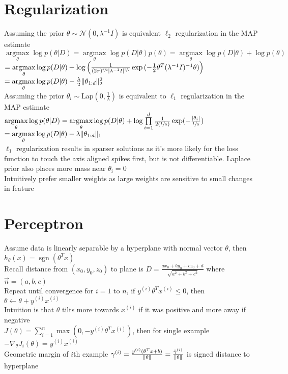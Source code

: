 \documentclass{article}
\newcommand{\N}{\mathcal{N}}
\DeclareMathOperator*{\argmax}{argmax}
\DeclareMathOperator{\sgn}{sgn}
\DeclarePairedDelimiter\abs{\lvert}{\rvert}
\DeclarePairedDelimiter\norm{\lVert}{\rVert}
\begin{document}
\section{Regularization}
Assuming the prior $\theta \sim \N(0, \lambda^{-1}I)$ is equivalent $\ell_2$ regularization in the MAP estimate \\
$\argmax\limits_\theta \log p(\theta | D) = \argmax\limits_\theta \log p(D | \theta) p(\theta) = \argmax\limits_\theta \log p(D| \theta) + \log p(\theta)$ \\
\hspace*{2.717cm} $ = \argmax\limits_\theta \log p(D| \theta) + \log \Big(\frac{1}{(2\pi)^{\sfrac{d}{2}} \abs{\lambda^{-1}I}^{\sfrac{1}{2}}}\exp{(-\frac{1}{2} \theta^T (\lambda^{-1}I)^{-1} \theta)}\Big) $ \\
\hspace*{2.717cm} $ =\argmax\limits_\theta  \log p(D| \theta) - \frac{\lambda}{2}\norm {\theta_{1:d}}_2^2$ \\
Assuming the prior $\theta_i \sim \mbox{Lap}(0, \frac{1}{\lambda})$ is equivalent to $\ell_1$ regularization in the MAP estimate \\
$\argmax\limits_\theta \log p(\theta | D) = \argmax\limits_\theta \log p(D| \theta) + \log \prod\limits_{i=1}^d \frac{1}{2 (\sfrac{1}{\lambda})}\exp (-\frac{\abs{ \theta_i}}{\sfrac{1}{\lambda}})$ \\
\hspace*{2.717cm} $ = \argmax\limits_\theta \log p(D| \theta) -\lambda \norm{\theta_{1:d}}_1$ \\
$\ell_1$ regularization results in sparser solutions as it's more likely for the loss function to touch the axis aligned spikes first, but is not differentiable. Laplace prior also places more mass near $\theta_i = 0$ \\
Intuitively prefer smaller weights as large weights are sensitive to small changes in feature


\newpage
\section{Perceptron}
Assume data is linearly separable by a hyperplane with normal vector $\theta$, then $h_\theta(x) = \sgn(\theta^Tx)$ \\
Recall distance from $(x_0, y_0, z_0)$ to plane is $D = \frac{ax_0 + by_0 + cz_0 + d}{\sqrt{a^2 + b^2 + c^2}}$ where $\vec n = (a, b, c)$ \\
Repeat until convergence for $i=1$ to $n$, if $y^{(i)}\theta^T x^{(i)} \leq 0$, then $\theta \leftarrow \theta + y^{(i)}x^{(i)}$ \\
Intuition is that $\theta$ tilts more towards $x^{(i)}$ if it was positive and more away if negative \\
$J(\theta) = \sum\limits_{i=1}^n \max(0, -y^{(i)} \theta^T x^{(i)})$, then for single example $-\nabla_\theta J_i(\theta) = y^{(i)}x^{(i)}$ \\
Geometric margin of $i$th example $\gamma^{(i)} = \frac{y^{(i)}(\theta^Tx + b)}{\norm \theta} = \frac{\hat{\gamma}^{(i)}}{\norm \theta}$ is signed distance to hyperplane
\end{document}
